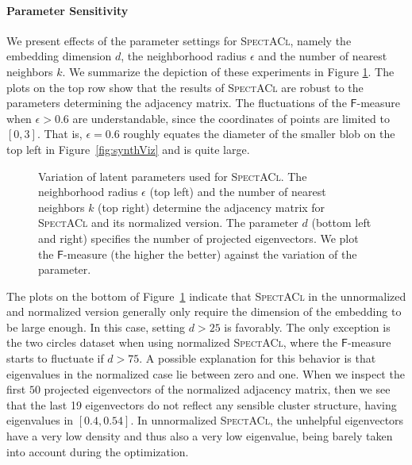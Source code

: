 \paragraph{Parameter Sensitivity}
We present effects of the parameter settings for \textsc{SpectACl}, namely the embedding dimension $d$, the neighborhood radius $\epsilon$ and the number of nearest neighbors $k$. We summarize the depiction of these experiments in Figure \ref{fig:paramPlot}. The plots on the top row show that the results of \textsc{SpectACl} are robust to the parameters determining the adjacency matrix. The fluctuations of the $\mathsf{F}$-measure when $\epsilon>0.6$ are understandable, since the coordinates of points are limited to $[0,3]$. That is, $\epsilon=0.6$ roughly equates the diameter of the smaller blob on the top left in Figure~\ref{fig:synthViz} and is quite large. 
\begin{figure}[t]
\centering

\caption{Variation of latent parameters used for \textsc{SpectACl}. The neighborhood radius $\epsilon$ (top left) and the number of nearest neighbors $k$ (top right) determine the adjacency matrix for \textsc{SpectACl} and its normalized version. The parameter $d$ (bottom left and right) specifies the number of projected eigenvectors. We plot the $\mathsf{F}$-measure (the higher the better) against the variation of the parameter.}
\label{fig:paramPlot}
\end{figure}
The plots on the bottom of Figure~\ref{fig:paramPlot} indicate that \textsc{SpectACl} in the unnormalized and normalized version generally only require the dimension of the embedding to be large enough. In this case, setting $d>25$ is favorably. The only exception is the two circles dataset when using normalized \textsc{SpectACl}, where the $\mathsf{F}$-measure starts to fluctuate if $d>75$. A possible explanation for this behavior is that eigenvalues in the normalized case lie between zero and one. When we inspect the first $50$ projected eigenvectors of the normalized adjacency matrix, then we see that the last 19 eigenvectors do not reflect any sensible cluster structure, having eigenvalues in $[0.4,0.54]$. In unnormalized \textsc{SpectACl}, the unhelpful eigenvectors have a very low density and thus also a very low eigenvalue, being barely taken into account during the optimization.

